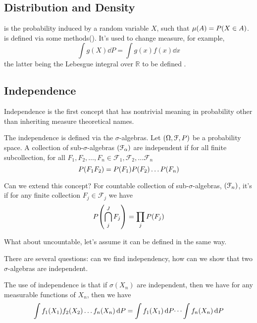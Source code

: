 \subsection{Distribution and Density}

 is the probability induced by a random variable \(X\), such that \(\mu(A) = P\pqty{X \in A}\).  is defined via some methods(). It's used to change measure, for example,
\begin{equation*}
    \int g(X) \dd{P} = \int g(x)f(x)\dd{x}
\end{equation*}
the latter being the Lebesgue integral over \(\mathbb{R}\) to be defined .


\subsection{Independence}

Independence is the first concept that has nontrivial meaning in probability other than inheriting measure theoretical names. 

The independence is defined via the \(\sigma\)-algebras. Let \(\pqty{\Omega, \mathcal{F}, P}\) be a probability space. A collection of sub-\(\sigma\)-algebras \(\pqty{\mathcal{F}_{\alpha}}\) are independent if for all finite subcollection, for all \(F_{1}, F_{2}, \dots, F_{n} \in\mathcal{F}_{1}, \mathcal{F}_{2}, \dots \mathcal{F}_{n}\)
\begin{equation*}
    P\pqty{F_{1} F_{2}} = P(F_{1}) P(F_{2}) \dots P \pqty{F_{n}}
\end{equation*}

Can we extend this concept? For countable collection of sub-\(\sigma\)-algebras, \(\pqty{\mathcal{F}_{n}}\), it's  if for any finite collection \(F_{j} \in \mathcal{F}_{j}\) we have 
\begin{equation*}
    P\pqty{\cap_{j}^{J} F_{j}} = \prod_{j} P \pqty{F_{j}}
\end{equation*}

What about uncountable, let's assume it can be defined in the same way. 

There are several questions: can we find independency, how can we show that two \(\sigma\)-algebras are independent. 

The use of independence is that if \(\sigma(X_{n})\) are independent, then we have for any measurable functions of \(X_{n}\), then we have 
\begin{equation*}
    \int f_{1}\pqty{X_{1}} f_{2}\pqty{X_{2}} \dots f_{n}\pqty{X_{n}} \dd{P} = \int f_{1}\pqty{X_{1}} \dd{P} \dots \int f_{n}\pqty{X_{n}} \dd{P}
\end{equation*}

